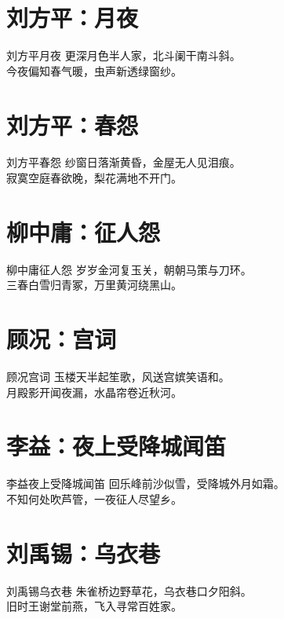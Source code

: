 \documentclass[12pt,oneside,a5paper]{book}
\begin{document}
\chapter{刘方平：月夜}
\begin{poemzh}{刘方平}{月夜}
更深月色半人家，北斗阑干南斗斜。\\
今夜偏知春气暖，虫声新透绿窗纱。\\ 
\end{poemzh}

\chapter{刘方平：春怨}
\begin{poemzh}{刘方平}{春怨}
纱窗日落渐黄昏，金屋无人见泪痕。\\
寂寞空庭春欲晚，梨花满地不开门。\\ 
\end{poemzh}

\chapter{柳中庸：征人怨}
\begin{poemzh}{柳中庸}{征人怨}
岁岁金河复玉关，朝朝马策与刀环。\\
三春白雪归青冢，万里黄河绕黑山。\\ 
\end{poemzh}

\chapter{顾况：宫词}
\begin{poemzh}{顾况}{宫词}
玉楼天半起笙歌，风送宫嫔笑语和。\\
月殿影开闻夜漏，水晶帘卷近秋河。\\ 
\end{poemzh}

\chapter{李益：夜上受降城闻笛}
\begin{poemzh}{李益}{夜上受降城闻笛}
回乐峰前沙似雪，受降城外月如霜。\\
不知何处吹芦管，一夜征人尽望乡。\\ 
\end{poemzh}

\chapter{刘禹锡：乌衣巷}
\begin{poemzh}{刘禹锡}{乌衣巷}
朱雀桥边野草花，乌衣巷口夕阳斜。\\
旧时王谢堂前燕，飞入寻常百姓家。\\ 
\end{poemzh}
\end{document}
